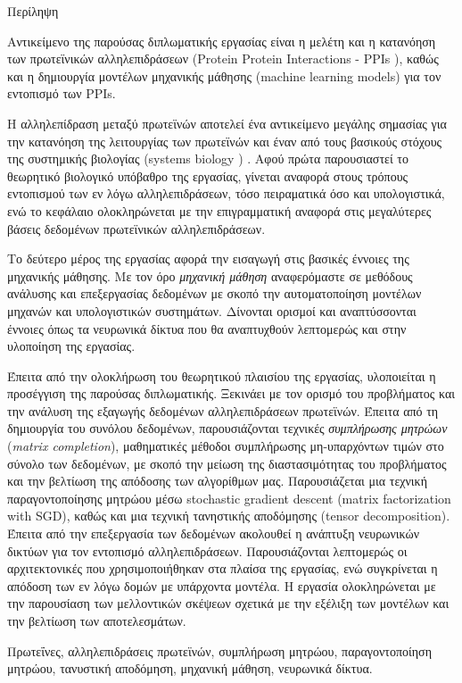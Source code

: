 \pagestyle{plain}
\begin{center}
{\LARGE Περίληψη}\\[1cm]
\end{center}

Αντικείμενο της παρούσας διπλωματικής εργασίας είναι η μελέτη και η κατανόηση των πρωτεϊνικών αλληλεπιδράσεων (Protein Protein Interactions - PPIs ), καθώς και η δημιουργία μοντέλων μηχανικής μάθησης (machine learning models) για τον εντοπισμό των PPIs. 

\medskip
H αλληλεπίδραση μεταξύ πρωτεϊνών αποτελεί ένα αντικείμενο μεγάλης σημασίας για την κατανόηση της λειτουργίας των πρωτεϊνών και έναν από τους βασικούς στόχους της συστημικής βιολογίας (systems biology ) \cite{Rao2014}. Αφού πρώτα παρουσιαστεί το θεωρητικό βιολογικό υπόβαθρο της εργασίας, γίνεται αναφορά στους τρόπους εντοπισμού των εν λόγω αλληλεπιδράσεων, τόσο πειραματικά όσο και υπολογιστικά, ενώ το κεφάλαιο ολοκληρώνεται με την επιγραμματική αναφορά στις μεγαλύτερες βάσεις δεδομένων πρωτεϊνικών αλληλεπιδράσεων.

\medskip
Το δεύτερο μέρος της εργασίας αφορά την εισαγωγή στις βασικές έννοιες της μηχανικής μάθησης. Με τον όρο \textit{μηχανική μάθηση} αναφερόμαστε σε μεθόδους ανάλυσης και επεξεργασίας δεδομένων με σκοπό την αυτοματοποίηση μοντέλων μηχανών και υπολογιστικών συστημάτων. Δίνονται ορισμοί και αναπτύσσονται έννοιες όπως τα νευρωνικά δίκτυα που θα αναπτυχθούν λεπτομερώς και στην υλοποίηση της εργασίας.

\medskip
Έπειτα από την ολοκλήρωση του θεωρητικού πλαισίου της εργασίας, υλοποιείται η προσέγγιση της παρούσας διπλωματικής. Ξεκινάει με τον ορισμό του προβλήματος και την ανάλυση της εξαγωγής δεδομένων αλληλεπιδράσεων πρωτεϊνών. Έπειτα από τη δημιουργία του συνόλου δεδομένων, παρουσιάζονται τεχνικές \textit{συμπλήρωσης μητρώων} (\textit{matrix completion}), μαθηματικές μέθοδοι συμπλήρωσης μη-υπαρχόντων τιμών στο σύνολο των δεδομένων, με σκοπό την μείωση της διαστασιμότητας του προβλήματος και την βελτίωση της απόδοσης των αλγορίθμων μας. Παρουσιάζεται μια τεχνική παραγοντοποίησης μητρώου μέσω stochastic gradient descent (matrix factorization with SGD), καθώς και μια τεχνική τανηστικής αποδόμησης (tensor decomposition). Έπειτα από την επεξεργασία των δεδομένων ακολουθεί η ανάπτυξη νευρωνικών δικτύων για τον εντοπισμό αλληλεπιδράσεων. Παρουσιάζονται λεπτομερώς οι αρχιτεκτονικές που χρησιμοποιήθηκαν στα πλαίσα της εργασίας, ενώ συγκρίνεται η απόδοση των εν λόγω δομών με υπάρχοντα μοντέλα. Η εργασία ολοκληρώνεται με την παρουσίαση των μελλοντικών σκέψεων σχετικά με την εξέλιξη των μοντέλων και την βελτίωση των αποτελεσμάτων.

\medskip
{} Πρωτεΐνες, αλληλεπιδράσεις πρωτεϊνών, συμπλήρωση μητρώου, παραγοντοποίηση μητρώου, τανυστική αποδόμηση, μηχανική μάθηση, νευρωνικά δίκτυα.

